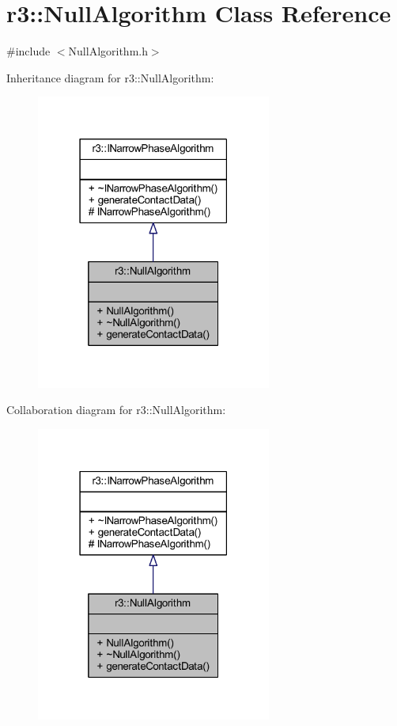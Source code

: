 \hypertarget{classr3_1_1_null_algorithm}{}\section{r3\+:\+:Null\+Algorithm Class Reference}
\label{classr3_1_1_null_algorithm}


{\ttfamily \#include $<$Null\+Algorithm.\+h$>$}



Inheritance diagram for r3\+:\+:Null\+Algorithm\+:\nopagebreak
\begin{figure}[H]
\begin{center}
\leavevmode
\includegraphics[width=219pt]{classr3_1_1_null_algorithm__inherit__graph}
\end{center}
\end{figure}


Collaboration diagram for r3\+:\+:Null\+Algorithm\+:\nopagebreak
\begin{figure}[H]
\begin{center}
\leavevmode
\includegraphics[width=219pt]{classr3_1_1_null_algorithm__coll__graph}
\end{center}
\end{figure}
